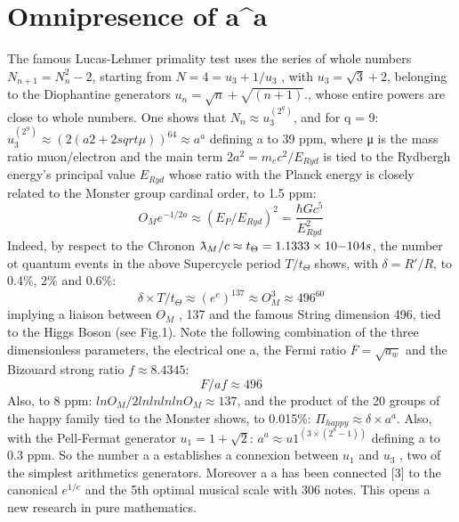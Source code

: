 \section {Omnipresence of a^a}

The famous Lucas-Lehmer primality test uses the series of whole numbers $N_{n+1} = N_{n}^{2} - 2$,
starting from $N = 4 = u_{3} + 1/u_{3}$ , with $u_{3} = \sqrt{3} + 2$, belonging to the Diophantine generators $u_{n} = \sqrt{n} + \sqrt{(n+1)}$., whose entire powers are close to whole numbers. One shows that $N_{n} \approx u_{3}^{(2^{q})}$, and for q = 9:
$u_{3}^(2^9) \approx (2(a2 + 2sqrt{\mu}))^{64} \approx a^{a}$
defining a to 39 ppm, where μ is the mass ratio muon/electron and the main term $2a^{2} = m_{e} c^{2}/E_{Ryd}$ is
tied to the Rydbergh energy's principal value $E_{Ryd}$ whose ratio with the Planck energy is closely
related to the Monster group cardinal order, to 1.5 ppm:
$$O_{M} e^{-1/2a} \approx (E_{P} /E_{Ryd})^{2} = \frac{\hbar Gc^{5}}{E_{Ryd}^2}$$
Indeed, by respect to the Chronon $\lambdabar_M /c \approx t_{\Theta} = 1.1333 \times 10{-104} s$, the number ot quantum events in
the above Supercycle period $T/ t_{\Theta}$ shows, with $\delta = R\prime/R$, to 0.4\%, 2\% and 0.6\%:
$$\delta \times T/t_{\Theta} \approx (e^{e} )^{137} \approx O_{M}^{3} \approx 496^{60}$$
implying a liaison between $O_{M}$ , 137 and the famous String dimension 496, tied to the Higgs Boson
(see Fig.1). Note the following combination of the three dimensionless parameters, the electrical
one a, the Fermi ratio $F =\sqrt{a_{w}}$ and the Bizouard strong ratio $f \approx 8.4345$:
$$F/af \approx 496$$
Also, to 8 ppm: $lnO_{M} /2lnlnlnlnO_{M} \approx 137$, and the product of the 20 groups of the happy family tied
to the Monster shows, to 0.015\%:
$\Pi_{happy} \approx \delta \times a^{a}$. Also, with the Pell-Fermat generator $u_{1} = 1 + \sqrt{2}$:
$a^{a} \approx u 1^(3\times(2^{8} - 1))$
defining a to 0.3 ppm. So the number a a establishes a connexion between $u_{1}$ and $u_{3}$ , two of the
simplest arithmetics generators. Moreover a a has been connected [3] to the canonical $e^{1/e}$ and the
5th optimal musical scale with 306 notes. This opens a new research in pure mathematics.


